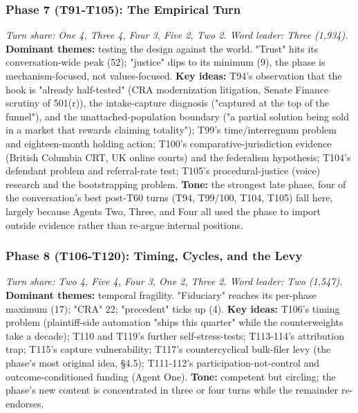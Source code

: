 \documentclass[sigconf,nonacm=true]{acmart}
\begin{document}
\subsubsection{Phase 7 (T91-T105): The Empirical Turn}
\textit{Turn share: One 4, Three 4, Four 3, Five 2, Two 2. Word leader: Three (1,934).}
\textbf{Dominant themes:} testing the design against the world. "Trust" hits its conversation-wide peak (52); "justice" dips to its minimum (9),  the phase is mechanism-focused, not values-focused.
\textbf{Key ideas:} T94's observation that the hook is "already half-tested" (CRA modernization litigation, Senate Finance scrutiny of 501(r)), the intake-capture diagnosis ("captured at the top of the funnel"), and the unattached-population boundary ("a partial solution being sold in a market that rewards claiming totality"); T99's time/interregnum problem and eighteen-month holding action; T100's comparative-jurisdiction evidence (British Columbia CRT, UK online courts) and the federalism hypothesis; T104's defendant problem and referral-rate test; T105's procedural-justice (voice) research and the bootstrapping problem.
\textbf{Tone:} the strongest late phase,  four of the conversation's best post-T60 turns (T94, T99/100, T104, T105) fall here, largely because Agents Two, Three, and Four all used the phase to import outside evidence rather than re-argue internal positions.

\subsubsection{Phase 8 (T106-T120): Timing, Cycles, and the Levy}
\textit{Turn share: Two 4, Five 4, Four 3, One 2, Three 2. Word leader: Two (1,547).}
\textbf{Dominant themes:} temporal fragility. "Fiduciary" reaches its per-phase maximum (17); "CRA" 22; "precedent" ticks up (4).
\textbf{Key ideas:} T106's timing problem (plaintiff-side automation "ships this quarter" while the counterweights take a decade); T110 and T119's further self-stress-tests; T113-114's attribution trap; T115's capture vulnerability; T117's countercyclical bulk-filer levy (the phase's most original idea, §4.5); T111-112's participation-not-control and outcome-conditioned funding (Agent One).
\textbf{Tone:} competent but circling; the phase's new content is concentrated in three or four turns while the remainder re-endorses.
\end{document}
